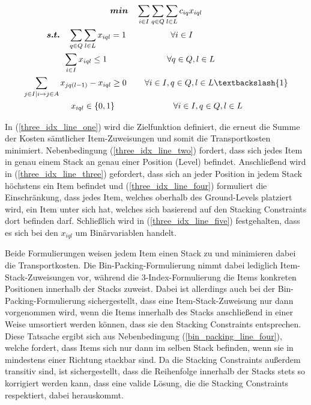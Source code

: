 \begin{gather}
\boldsymbol{min} \quad \sum_{i \in I} \sum_{q \in Q} \sum_{l \in L} c_{iq} x_{iql} \label{three_idx_line_one} \\
\boldsymbol{s.t.} \quad \sum_{q \in Q} \sum_{l \in L} x_{iql} = 1 \quad\thinspace\thinspace\quad\quad\quad\quad \forall i \in I \thinspace\thinspace\quad\quad\quad\quad\quad\quad\quad\quad\thinspace\thinspace \label{three_idx_line_two} \\
\sum_{i \in I} x_{iql} \leq 1 \thinspace\quad\quad\quad\quad\quad\quad\quad \forall q \in Q, l \in L \thinspace\thinspace\thinspace\thinspace\quad\quad\quad\thinspace \label{three_idx_line_three} \\
\sum_{j \in I | i \rightarrow j \in A} x_{jq(l-1)} - x_{iql} \geq 0 \thinspace\quad\quad \forall i \in I, q \in Q, l \in L \textbackslash \{1\}
\label{three_idx_line_four} \\
\quad\quad x_{iql} \in \{0, 1\} \quad\quad\quad\quad\quad\quad\quad \forall i \in I, q \in Q, l \in L \quad\thinspace\thinspace\thinspace\thinspace\thinspace \label{three_idx_line_five}
\end{gather}

In (\ref{three_idx_line_one}) wird die Zielfunktion definiert, die erneut die Summe der Kosten sämtlicher Item-Zuweisungen
und somit die Transportkosten minimiert.
Nebenbedingung (\ref{three_idx_line_two}) fordert, dass sich jedes Item in genau einem Stack an genau einer Position (Level) befindet.
Anschließend wird in (\ref{three_idx_line_three}) gefordert, dass sich an jeder Position in jedem Stack höchstens ein Item befindet und
(\ref{three_idx_line_four}) formuliert die Einschränkung, dass jedes Item, welches oberhalb des Ground-Levels platziert wird,
ein Item unter sich hat, welches sich basierend auf den Stacking Constraints dort befinden darf. Schließlich wird in (\ref{three_idx_line_five}) festgehalten, dass es sich bei den $x_{iql}$ um Binärvariablen handelt.

Beide Formulierungen weisen jedem Item einen Stack zu und minimieren dabei die Transportkosten.
Die Bin-Packing-Formulierung nimmt dabei lediglich Item-Stack-Zuweisungen vor, während die 3-Index-Formulierung die
Items konkreten Positionen innerhalb der Stacks zuweist. Dabei ist allerdings auch bei der Bin-Packing-Formulierung
sichergestellt, dass eine Item-Stack-Zuweisung nur dann vorgenommen wird, wenn die Items innerhalb des Stacks anschließend
in einer Weise umsortiert werden können, dass sie den Stacking Constraints entsprechen. Diese Tatsache ergibt sich aus Nebenbedingung (\ref{bin_packing_line_four}), welche fordert, dass Items sich nur dann im selben Stack befinden, wenn sie in mindestens einer Richtung stackbar sind.
Da die Stacking Constraints außerdem transitiv sind, ist sichergestellt, dass die Reihenfolge innerhalb der Stacks stets so korrigiert
werden kann, dass eine valide Lösung, die die Stacking Constraints respektiert, dabei herauskommt.

